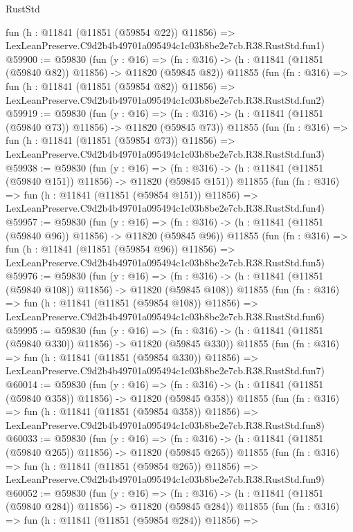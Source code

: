 \begin{lexlean}{RustStd}
\begin{coremodule}
    fun (h : @11841 (@11851 (@59854 @22)) @11856) =>
    LexLeanPreserve.C9d2b4b49701a095494c1c03b8be2e7cb.R38.RustStd.fun1)
@59900 := @59830
    (fun (y : @16) =>
    (fn : @316) -> (h : @11841 (@11851 (@59840 @82)) @11856) -> @11820 (@59845 @82))
    @11855
    (fun (fn : @316) =>
    fun (h : @11841 (@11851 (@59854 @82)) @11856) =>
    LexLeanPreserve.C9d2b4b49701a095494c1c03b8be2e7cb.R38.RustStd.fun2)
@59919 := @59830
    (fun (y : @16) =>
    (fn : @316) -> (h : @11841 (@11851 (@59840 @73)) @11856) -> @11820 (@59845 @73))
    @11855
    (fun (fn : @316) =>
    fun (h : @11841 (@11851 (@59854 @73)) @11856) =>
    LexLeanPreserve.C9d2b4b49701a095494c1c03b8be2e7cb.R38.RustStd.fun3)
@59938 := @59830
    (fun (y : @16) =>
    (fn : @316) -> (h : @11841 (@11851 (@59840 @151)) @11856) -> @11820 (@59845 @151))
    @11855
    (fun (fn : @316) =>
    fun (h : @11841 (@11851 (@59854 @151)) @11856) =>
    LexLeanPreserve.C9d2b4b49701a095494c1c03b8be2e7cb.R38.RustStd.fun4)
@59957 := @59830
    (fun (y : @16) =>
    (fn : @316) -> (h : @11841 (@11851 (@59840 @96)) @11856) -> @11820 (@59845 @96))
    @11855
    (fun (fn : @316) =>
    fun (h : @11841 (@11851 (@59854 @96)) @11856) =>
    LexLeanPreserve.C9d2b4b49701a095494c1c03b8be2e7cb.R38.RustStd.fun5)
@59976 := @59830
    (fun (y : @16) =>
    (fn : @316) -> (h : @11841 (@11851 (@59840 @108)) @11856) -> @11820 (@59845 @108))
    @11855
    (fun (fn : @316) =>
    fun (h : @11841 (@11851 (@59854 @108)) @11856) =>
    LexLeanPreserve.C9d2b4b49701a095494c1c03b8be2e7cb.R38.RustStd.fun6)
@59995 := @59830
    (fun (y : @16) =>
    (fn : @316) -> (h : @11841 (@11851 (@59840 @330)) @11856) -> @11820 (@59845 @330))
    @11855
    (fun (fn : @316) =>
    fun (h : @11841 (@11851 (@59854 @330)) @11856) =>
    LexLeanPreserve.C9d2b4b49701a095494c1c03b8be2e7cb.R38.RustStd.fun7)
@60014 := @59830
    (fun (y : @16) =>
    (fn : @316) -> (h : @11841 (@11851 (@59840 @358)) @11856) -> @11820 (@59845 @358))
    @11855
    (fun (fn : @316) =>
    fun (h : @11841 (@11851 (@59854 @358)) @11856) =>
    LexLeanPreserve.C9d2b4b49701a095494c1c03b8be2e7cb.R38.RustStd.fun8)
@60033 := @59830
    (fun (y : @16) =>
    (fn : @316) -> (h : @11841 (@11851 (@59840 @265)) @11856) -> @11820 (@59845 @265))
    @11855
    (fun (fn : @316) =>
    fun (h : @11841 (@11851 (@59854 @265)) @11856) =>
    LexLeanPreserve.C9d2b4b49701a095494c1c03b8be2e7cb.R38.RustStd.fun9)
@60052 := @59830
    (fun (y : @16) =>
    (fn : @316) -> (h : @11841 (@11851 (@59840 @284)) @11856) -> @11820 (@59845 @284))
    @11855
    (fun (fn : @316) =>
    fun (h : @11841 (@11851 (@59854 @284)) @11856) =>

\end{coremodule}
\end{lexlean}
